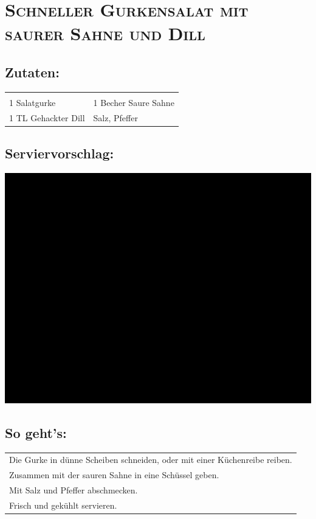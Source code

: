 \section{\textsc{Schneller Gurkensalat mit saurer Sahne und Dill}}

\subsection*{Zutaten:}

\begin{tabular}{p{7.5cm} p{7.5cm}}
	& \\
	1 Salatgurke & 1 Becher Saure Sahne \\
	1 TL Gehackter Dill & Salz, Pfeffer
\end{tabular}

\subsection*{Serviervorschlag:}

\includegraphics[width=\textwidth]{img/ph.jpg} \cite{gurkensalatdill}

\subsection*{So geht's:}

\begin{tabular}{p{15cm}}
	\\
  Die Gurke in dünne Scheiben schneiden, oder mit einer Küchenreibe reiben.\\
  Zusammen mit der sauren Sahne in eine Schüssel geben.\\
  Mit Salz und Pfeffer abschmecken.\\
  Frisch und gekühlt servieren.
\end{tabular}
